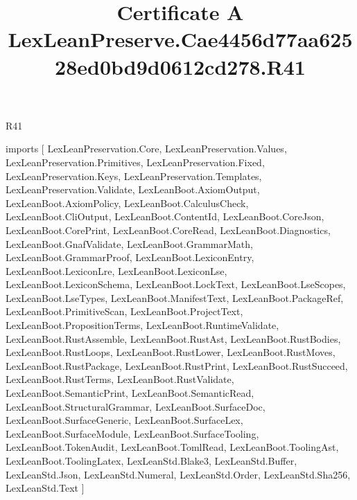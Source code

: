 \begin{lexlean}{R41}
\title{Certificate A LexLeanPreserve.Cae4456d77aa62528ed0bd9d0612cd278.R41}
\begin{coremodule}
imports [
  LexLeanPreservation.Core,
  LexLeanPreservation.Values,
  LexLeanPreservation.Primitives,
  LexLeanPreservation.Fixed,
  LexLeanPreservation.Keys,
  LexLeanPreservation.Templates,
  LexLeanPreservation.Validate,
  LexLeanBoot.AxiomOutput,
  LexLeanBoot.AxiomPolicy,
  LexLeanBoot.CalculusCheck,
  LexLeanBoot.CliOutput,
  LexLeanBoot.ContentId,
  LexLeanBoot.CoreJson,
  LexLeanBoot.CorePrint,
  LexLeanBoot.CoreRead,
  LexLeanBoot.Diagnostics,
  LexLeanBoot.GnafValidate,
  LexLeanBoot.GrammarMath,
  LexLeanBoot.GrammarProof,
  LexLeanBoot.LexiconEntry,
  LexLeanBoot.LexiconLre,
  LexLeanBoot.LexiconLse,
  LexLeanBoot.LexiconSchema,
  LexLeanBoot.LockText,
  LexLeanBoot.LseScopes,
  LexLeanBoot.LseTypes,
  LexLeanBoot.ManifestText,
  LexLeanBoot.PackageRef,
  LexLeanBoot.PrimitiveScan,
  LexLeanBoot.ProjectText,
  LexLeanBoot.PropositionTerms,
  LexLeanBoot.RuntimeValidate,
  LexLeanBoot.RustAssemble,
  LexLeanBoot.RustAst,
  LexLeanBoot.RustBodies,
  LexLeanBoot.RustLoops,
  LexLeanBoot.RustLower,
  LexLeanBoot.RustMoves,
  LexLeanBoot.RustPackage,
  LexLeanBoot.RustPrint,
  LexLeanBoot.RustSucceed,
  LexLeanBoot.RustTerms,
  LexLeanBoot.RustValidate,
  LexLeanBoot.SemanticPrint,
  LexLeanBoot.SemanticRead,
  LexLeanBoot.StructuralGrammar,
  LexLeanBoot.SurfaceDoc,
  LexLeanBoot.SurfaceGeneric,
  LexLeanBoot.SurfaceLex,
  LexLeanBoot.SurfaceModule,
  LexLeanBoot.SurfaceTooling,
  LexLeanBoot.TokenAudit,
  LexLeanBoot.TomlRead,
  LexLeanBoot.ToolingAst,
  LexLeanBoot.ToolingLatex,
  LexLeanStd.Blake3,
  LexLeanStd.Buffer,
  LexLeanStd.Json,
  LexLeanStd.Numeral,
  LexLeanStd.Order,
  LexLeanStd.Sha256,
  LexLeanStd.Text
]


\end{coremodule}
\end{lexlean}
